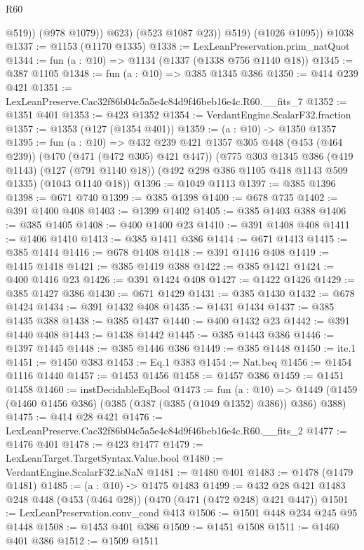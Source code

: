 \begin{lexlean}{R60}
\begin{coremodule}
                  @519))
              (@978 @1079))
            @623)
          (@523 @1087 @23))
        @519)
      (@1026 @1095))
    @1038
@1337 := @1153 (@1170 @1335)
@1338 := LexLeanPreservation.prim_natQuot
@1344 := fun (a : @10) => @1134 (@1337 (@1338 @756 @1140 @18))
@1345 := @387 @1105
@1348 := fun (a : @10) => @385 @1345 @386
@1350 := @414 @239 @421
@1351 := LexLeanPreserve.Cac32f86b04c5a5e4c84d9f46beb16e4c.R60.__fits_7
@1352 := @1351 @401
@1353 := @423 @1352
@1354 := VerdantEngine.ScalarF32.fraction
@1357 := @1353 (@127 (@1354 @401))
@1359 := (a : @10) -> @1350 @1357
@1395 := fun (a : @10) =>
  @432
    @239
    @421
    @1357
    @305
    @448
    (@453 (@464 @239))
    (@470 (@471 (@472 @305) @421 @447))
    (@775
      @303
      @1345
      @386
      (@419 @1143)
      (@127 (@791 @1140 @18))
      (@492 @298 @386 @1105 @418 @1143 @509 @1335)
      (@1043 @1140 @18))
@1396 := @1049 @1113
@1397 := @385 @1396
@1398 := @671 @740
@1399 := @385 @1398
@1400 := @678 @735
@1402 := @391 @1400 @408
@1403 := @1399 @1402
@1405 := @385 @1403 @388
@1406 := @385 @1405
@1408 := @400 @1400 @23
@1410 := @391 @1408 @408
@1411 := @1406 @1410
@1413 := @385 @1411 @386
@1414 := @671 @1413
@1415 := @385 @1414
@1416 := @678 @1408
@1418 := @391 @1416 @408
@1419 := @1415 @1418
@1421 := @385 @1419 @388
@1422 := @385 @1421
@1424 := @400 @1416 @23
@1426 := @391 @1424 @408
@1427 := @1422 @1426
@1429 := @385 @1427 @386
@1430 := @671 @1429
@1431 := @385 @1430
@1432 := @678 @1424
@1434 := @391 @1432 @408
@1435 := @1431 @1434
@1437 := @385 @1435 @388
@1438 := @385 @1437
@1440 := @400 @1432 @23
@1442 := @391 @1440 @408
@1443 := @1438 @1442
@1445 := @385 @1443 @386
@1446 := @1397 @1445
@1448 := @385 @1446 @386
@1449 := @385 @1448
@1450 := ite.{1}
@1451 := @1450 @383
@1453 := Eq.{1} @383
@1454 := Nat.beq
@1456 := @1454 @1116 @1440
@1457 := @1453 @1456
@1458 := @1457 @386
@1459 := @1451 @1458
@1460 := instDecidableEqBool
@1473 := fun (a : @10) =>
  @1449 (@1459 (@1460 @1456 @386) (@385 (@387 (@385 (@1049 @1352) @386)) @386) @388)
@1475 := @414 @28 @421
@1476 := LexLeanPreserve.Cac32f86b04c5a5e4c84d9f46beb16e4c.R60.__fits_2
@1477 := @1476 @401
@1478 := @423 @1477
@1479 := LexLeanTarget.TargetSyntax.Value.bool
@1480 := VerdantEngine.ScalarF32.isNaN
@1481 := @1480 @401
@1483 := @1478 (@1479 @1481)
@1485 := (a : @10) -> @1475 @1483
@1499 := @432 @28 @421 @1483 @248 @448 (@453 (@464 @28)) (@470 (@471 (@472 @248) @421 @447))
@1501 := LexLeanPreservation.conv_cond @413
@1506 := @1501 @448 @234 @245 @95 @1448
@1508 := @1453 @401 @386
@1509 := @1451 @1508
@1511 := @1460 @401 @386
@1512 := @1509 @1511

\end{coremodule}
\end{lexlean}
